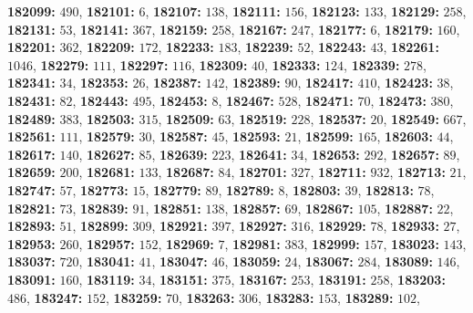 \textsf{\bfseries 182099:} $490$, \textsf{\bfseries 182101:} $6$, \textsf{\bfseries 182107:} $138$, \textsf{\bfseries 182111:} $156$, \textsf{\bfseries 182123:} $133$, \textsf{\bfseries 182129:} $258$, \textsf{\bfseries 182131:} $53$, \textsf{\bfseries 182141:} $367$, \textsf{\bfseries 182159:} $258$, \textsf{\bfseries 182167:} $247$, \textsf{\bfseries 182177:} $6$, \textsf{\bfseries 182179:} $160$, \textsf{\bfseries 182201:} $362$, \textsf{\bfseries 182209:} $172$, \textsf{\bfseries 182233:} $183$, \textsf{\bfseries 182239:} $52$, \textsf{\bfseries 182243:} $43$, \textsf{\bfseries 182261:} $1046$, \textsf{\bfseries 182279:} $111$, \textsf{\bfseries 182297:} $116$, \textsf{\bfseries 182309:} $40$, \textsf{\bfseries 182333:} $124$, \textsf{\bfseries 182339:} $278$, \textsf{\bfseries 182341:} $34$, \textsf{\bfseries 182353:} $26$, \textsf{\bfseries 182387:} $142$, \textsf{\bfseries 182389:} $90$, \textsf{\bfseries 182417:} $410$, \textsf{\bfseries 182423:} $38$, \textsf{\bfseries 182431:} $82$, \textsf{\bfseries 182443:} $495$, \textsf{\bfseries 182453:} $8$, \textsf{\bfseries 182467:} $528$, \textsf{\bfseries 182471:} $70$, \textsf{\bfseries 182473:} $380$, \textsf{\bfseries 182489:} $383$, \textsf{\bfseries 182503:} $315$, \textsf{\bfseries 182509:} $63$, \textsf{\bfseries 182519:} $228$, \textsf{\bfseries 182537:} $20$, \textsf{\bfseries 182549:} $667$, \textsf{\bfseries 182561:} $111$, \textsf{\bfseries 182579:} $30$, \textsf{\bfseries 182587:} $45$, \textsf{\bfseries 182593:} $21$, \textsf{\bfseries 182599:} $165$, \textsf{\bfseries 182603:} $44$, \textsf{\bfseries 182617:} $140$, \textsf{\bfseries 182627:} $85$, \textsf{\bfseries 182639:} $223$, \textsf{\bfseries 182641:} $34$, \textsf{\bfseries 182653:} $292$, \textsf{\bfseries 182657:} $89$, \textsf{\bfseries 182659:} $200$, \textsf{\bfseries 182681:} $133$, \textsf{\bfseries 182687:} $84$, \textsf{\bfseries 182701:} $327$, \textsf{\bfseries 182711:} $932$, \textsf{\bfseries 182713:} $21$, \textsf{\bfseries 182747:} $57$, \textsf{\bfseries 182773:} $15$, \textsf{\bfseries 182779:} $89$, \textsf{\bfseries 182789:} $8$, \textsf{\bfseries 182803:} $39$, \textsf{\bfseries 182813:} $78$, \textsf{\bfseries 182821:} $73$, \textsf{\bfseries 182839:} $91$, \textsf{\bfseries 182851:} $138$, \textsf{\bfseries 182857:} $69$, \textsf{\bfseries 182867:} $105$, \textsf{\bfseries 182887:} $22$, \textsf{\bfseries 182893:} $51$, \textsf{\bfseries 182899:} $309$, \textsf{\bfseries 182921:} $397$, \textsf{\bfseries 182927:} $316$, \textsf{\bfseries 182929:} $78$, \textsf{\bfseries 182933:} $27$, \textsf{\bfseries 182953:} $260$, \textsf{\bfseries 182957:} $152$, \textsf{\bfseries 182969:} $7$, \textsf{\bfseries 182981:} $383$, \textsf{\bfseries 182999:} $157$, \textsf{\bfseries 183023:} $143$, \textsf{\bfseries 183037:} $720$, \textsf{\bfseries 183041:} $41$, \textsf{\bfseries 183047:} $46$, \textsf{\bfseries 183059:} $24$, \textsf{\bfseries 183067:} $284$, \textsf{\bfseries 183089:} $146$, \textsf{\bfseries 183091:} $160$, \textsf{\bfseries 183119:} $34$, \textsf{\bfseries 183151:} $375$, \textsf{\bfseries 183167:} $253$, \textsf{\bfseries 183191:} $258$, \textsf{\bfseries 183203:} $486$, \textsf{\bfseries 183247:} $152$, \textsf{\bfseries 183259:} $70$, \textsf{\bfseries 183263:} $306$, \textsf{\bfseries 183283:} $153$, \textsf{\bfseries 183289:} $102$, 
